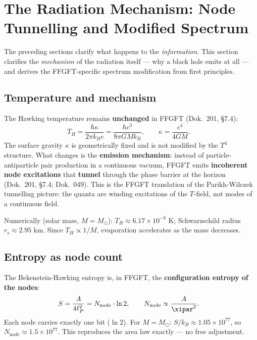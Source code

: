 \section{The Radiation Mechanism: Node Tunnelling and Modified Spectrum}

The preceding sections clarify what happens to the \emph{information}. This section clarifies the \emph{mechanism} of the radiation itself --- why a black hole emits at all --- and derives the FFGFT-specific spectrum modification from first principles.

\subsection{Temperature and mechanism}

The Hawking temperature remains \textbf{unchanged} in FFGFT (Dok.~201, §7.4):
\begin{equation}
  T_H = \frac{\hbar \kappa}{2\pi k_B c} = \frac{\hbar c^3}{8\pi G M k_B},
  \qquad \kappa = \frac{c^4}{4GM}.
\end{equation}
The surface gravity $\kappa$ is geometrically fixed and is not modified by the $T^4$ structure. What changes is the \textbf{emission mechanism}: instead of particle-antiparticle pair production in a continuous vacuum, FFGFT emits \textbf{incoherent node excitations} that \textbf{tunnel} through the phase barrier at the horizon (Dok.~201, §7.4; Dok.~049). This is the FFGFT translation of the Parikh-Wilczek tunnelling picture: the quanta are winding excitations of the $T$-field, not modes of a continuous field.

Numerically (solar mass, $M = M_\odot$): $T_H \approx 6.17 \times 10^{-8}$ K; Schwarzschild radius $r_s \approx 2.95$ km. Since $T_H \propto 1/M$, evaporation accelerates as the mass decreases.

\subsection{Entropy as node count}

The Bekenstein-Hawking entropy is, in FFGFT, the \textbf{configuration entropy of the nodes}:
\begin{equation}
  S = \frac{A}{4 \ell_P^2} = N_\text{node} \cdot \ln 2,
  \qquad N_\text{node} \propto \frac{A}{\xipar^2}.
\end{equation}
Each node carries exactly one bit ($\ln 2$). For $M = M_\odot$: $S/k_B \approx 1.05 \times 10^{77}$, so $N_\text{node} \approx 1.5 \times 10^{77}$. This reproduces the area law exactly --- no free adjustment.

